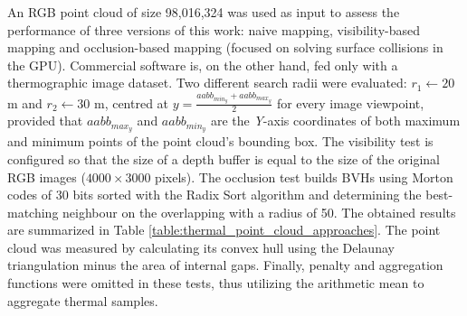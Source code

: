 An RGB point cloud of size 98,016,324 was used as input to assess the performance of three versions of this work: naive mapping, visibility-based mapping and occlusion-based mapping (focused on solving surface collisions in the GPU). Commercial software is, on the other hand, fed only with a thermographic image dataset. Two different search radii were evaluated: $r_1 \gets 20$ \si{\meter} and $r_2 \gets 30$ \si{\meter}, centred at $y = \frac{\textit{aabb}_{\textit{min}_{y}} + \textit{aabb}_{\textit{max}_{y}}}{2}$ for every image viewpoint, provided that $\textit{aabb}_{\textit{max}_{y}}$ and $\textit{aabb}_{\textit{min}_{y}}$ are the \textit{Y}-axis coordinates of both maximum and minimum points of the point cloud's bounding box. The visibility test is configured so that the size of a depth buffer is equal to the size of the original RGB images ($4000 \times 3000$ pixels). The occlusion test builds BVHs using Morton codes of 30 bits sorted with the Radix Sort algorithm and determining the best-matching neighbour on the overlapping with a radius of 50. The obtained results are summarized in Table \ref{table:thermal_point_cloud_approaches}. The point cloud was measured by calculating its convex hull using the Delaunay triangulation \cite{shewchuk_delaunay_2002} minus the area of internal gaps. Finally, penalty and aggregation functions were omitted in these tests, thus utilizing the arithmetic mean to aggregate thermal samples. 

